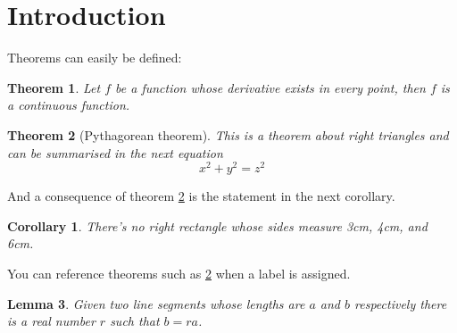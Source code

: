 \documentclass[12 pt]{amsart}
\newtheorem{theorem}{Theorem}[section]
\newtheorem{corollary}{Corollary}[theorem]
\newtheorem{lemma}[theorem]{Lemma}
\begin{document}
\section{Introduction}
Theorems can easily be defined:

\begin{theorem}
Let \(f\) be a function whose derivative exists in every point, then \(f\) is 
a continuous function.
\end{theorem}

\begin{theorem}[Pythagorean theorem]
\label{pythagorean}
This is a theorem about right triangles and can be summarised in the next 
equation 
\[ x^2 + y^2 = z^2 \]
\end{theorem}

And a consequence of theorem \ref{pythagorean} is the statement in the next 
corollary.

\begin{corollary}
There's no right rectangle whose sides measure 3cm, 4cm, and 6cm.
\end{corollary}

You can reference theorems such as \ref{pythagorean} when a label is assigned.

\begin{lemma}
Given two line segments whose lengths are \(a\) and \(b\) respectively there is a 
real number \(r\) such that \(b=ra\).
\end{lemma}
\end{document}
